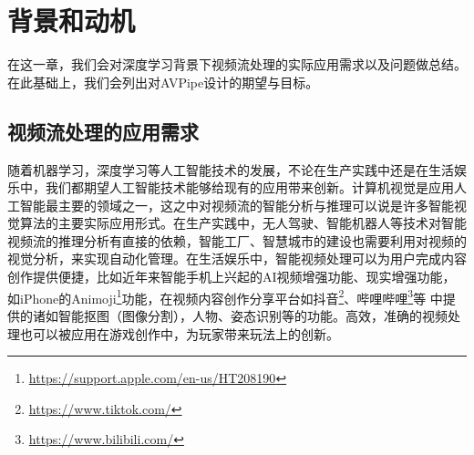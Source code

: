 
\chapter{背景和动机}
在这一章，我们会对深度学习背景下视频流处理的实际应用需求以及问题做总结。在此基础上，我们会列出对AVPipe设计的期望与目标。
\section{视频流处理的应用需求}\label{ch3:req}
随着机器学习，深度学习等人工智能技术的发展，不论在生产实践中还是在生活娱乐中，我们都期望人工智能技术能够给现有的应用带来创新。计算机视觉是应用人工智能最主要的领域之一，这之中对视频流的智能分析与推理可以说是许多智能视觉算法的主要实际应用形式。在生产实践中，无人驾驶、智能机器人等技术对智能视频流的推理分析有直接的依赖，智能工厂、智慧城市的建设也需要利用对视频的视觉分析，来实现自动化管理。在生活娱乐中，智能视频处理可以为用户完成内容创作提供便捷，比如近年来智能手机上兴起的AI视频增强功能、现实增强功能，如iPhone的Animoji\footnote{\url{https://support.apple.com/en-us/HT208190}}功能，在视频内容创作分享平台如抖音\footnote{\url{https://www.tiktok.com/}}、哔哩哔哩\footnote{\url{https://www.bilibili.com/}}等 %
中提供的诸如智能抠图（图像分割），人物、姿态识别等的功能。高效，准确的视频处理也可以被应用在游戏创作中，为玩家带来玩法上的创新。\par
